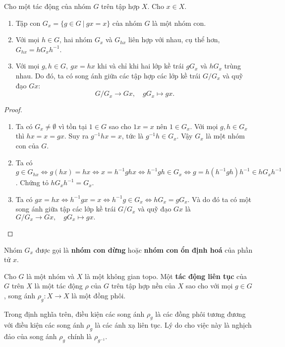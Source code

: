 \begin{prop}\label{prop 1.1.4}
    Cho một tác động của nhóm $G$ trên tập hợp $X$. Cho $x\in X$.
    \begin{enumerate}
        \item Tập con $G_x = \{g \in G~|~gx=x \}$ của nhóm $G$ là một nhóm con.
        \item Với mọi $h\in G$, hai nhóm $G_x$ và $G_{hx}$ liên hợp với nhau, cụ thể hơn, $G_{hx} = hG_xh^{-1}$.
        \item Với mọi $g,h \in G,~gx=hx$ khi và chỉ khi hai lớp kề trái $gG_x$ và $hG_x$ trùng nhau. Do đó, ta có song ánh giữa các tập hợp các lớp kề trái $G/G_x$ và quỹ đạo $Gx$:
        \[G/G_x \to Gx,\quad gG_x \mapsto gx.\]
    \end{enumerate}
\end{prop}
\begin{proof}
    \begin{enumerate}
        \item Ta có $G_x \neq \emptyset$ vì tồn tại $1 \in G$ sao cho $1x=x$ nên $1\in G_x$. Với mọi $g,h\in G_x$ thì $hx=x=gx$. Suy ra $g^{-1}hx=x$, tức là $g^{-1}h \in G_x$. Vậy $G_x$ là một nhóm con của $G$.
        \item Ta có $g\in G_{hx} \Leftrightarrow g(hx) = hx \Leftrightarrow x = h^{-1}ghx \Leftrightarrow h^{-1}gh \in G_x \Leftrightarrow g = h(h^{-1}gh)h^{-1} \in hG_xh^{-1}$. Chứng tỏ $hG_xh^{-1} = G_x$.

        \item Ta có $gx=hx \Leftrightarrow h^{-1}gx=x \Leftrightarrow h^{-1}g \in G_x \Leftrightarrow hG_x = gG_x$. Và do đó ta có một song ánh giữa tập các lớp kề trái $G/G_x$ và quỹ đạo $Gx$ là $G/G_x \to Gx,\quad gG_x \mapsto gx.$
    \end{enumerate}
\end{proof}

Nhóm $G_x$ được gọi là \textbf{nhóm con dừng} hoặc \textbf{nhóm con ổn định hoá} của phần tử $x$.
\begin{defn}\label{defn 1.1.5}
    Cho $G$ là một nhóm và $X$ là một không gian topo. Một \textbf{tác động liên tục} của $G$ trên $X$ là một tác động $\rho$ của $G$ trên tập hợp nền của $X$ sao cho với mọi $g\in G$, song ánh $\rho_g: X\to X$ là một đồng phôi.
\end{defn}
Trong định nghĩa trên, điều kiện các song ánh $\rho_g$ là các đồng phôi tương đương với điều kiện các song ánh $\rho_g$ là các ánh xạ liên tục. Lý do cho việc này là nghịch đảo của song ánh $\rho_g$ chính là $\rho_{g^{-1}}$.

